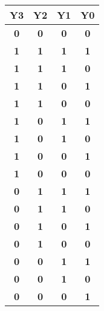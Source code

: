 \documentclass[english]{article}
\begin{document}
\begin{table}[htb]
\begin{tabular}{|c|c|c|c|}
\textbf{Y3} & \textbf{Y2} & \textbf{Y1} & \textbf{Y0} \\ \hline  
\textbf{0}  & \textbf{0}  & \textbf{0}  & \textbf{0}  \\ \hline  
\textbf{1}  & \textbf{1}  & \textbf{1}  & \textbf{1}  \\ \hline  
\textbf{1}  & \textbf{1}  & \textbf{1}  & \textbf{0}  \\ \hline  
\textbf{1}  & \textbf{1}  & \textbf{0}  & \textbf{1}  \\ \hline  
\textbf{1}  & \textbf{1}  & \textbf{0}  & \textbf{0}  \\ \hline  
\textbf{1}  & \textbf{0}  & \textbf{1}  & \textbf{1}  \\ \hline  
\textbf{1}  & \textbf{0}  & \textbf{1}  & \textbf{0}  \\ \hline  
\textbf{1}  & \textbf{0}  & \textbf{0}  & \textbf{1}  \\ \hline  
\textbf{1}  & \textbf{0}  & \textbf{0}  & \textbf{0}  \\ \hline  
\textbf{0}  & \textbf{1}  & \textbf{1}  & \textbf{1}  \\ \hline  
\textbf{0}  & \textbf{1}  & \textbf{1}  & \textbf{0}  \\ \hline  
\textbf{0}  & \textbf{1}  & \textbf{0}  & \textbf{1}  \\ \hline  
\textbf{0}  & \textbf{1}  & \textbf{0}  & \textbf{0}  \\ \hline  
\textbf{0}  & \textbf{0}  & \textbf{1}  & \textbf{1}  \\ \hline  
\textbf{0}  & \textbf{0}  & \textbf{1}  & \textbf{0}  \\ \hline  
\textbf{0}  & \textbf{0}  & \textbf{0}  & \textbf{1}  \\ \hline  
\end{tabular} 
\end{table}
\end{document}
